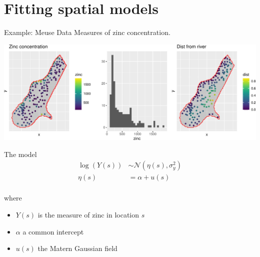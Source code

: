 \documentclass[
  ignorenonframetext,
]{beamer}
\begin{document}
\hypertarget{fitting-spatial-models}{%
\section{Fitting spatial models}\label{fitting-spatial-models}}

\begin{frame}{Example: Meuse Data}
\protect\hypertarget{example-meuse-data}{}
Measures of zinc concentration.

\begin{center}\includegraphics[width=0.6\linewidth,height=0.9\textheight]{Part3_advanced_files/figure-beamer/unnamed-chunk-9-1} \end{center}
\end{frame}

\begin{frame}{The model}
\protect\hypertarget{the-model}{}
\[
\begin{aligned}
\log(Y(s)) &\sim \mathcal{N}(\eta(s),\sigma^2_y)\\
\eta(s)& = \alpha + u(s)\\
\end{aligned}
\]

where

\begin{itemize}
\item
  \(Y(s)\) is the measure of zinc in location \(s\)
\item
  \(\alpha\) a common intercept
\item
  \(u(s)\) the Matern Gaussian field
\end{itemize}
\end{frame}
\end{document}
